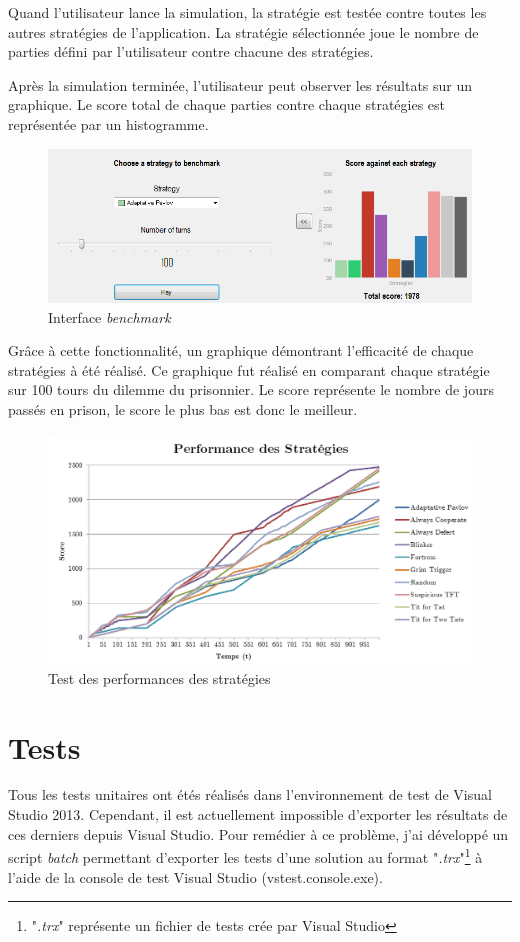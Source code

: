 \documentclass[a4paper]{article}
\begin{document}
Quand l'utilisateur lance la simulation, la stratégie est testée contre toutes les autres stratégies de l'application. La stratégie sélectionnée joue le nombre de parties défini par l'utilisateur contre chacune des stratégies.

Après la simulation terminée, l'utilisateur peut observer les résultats sur un graphique. Le score total de chaque parties contre chaque stratégies est représentée par un histogramme.

\begin{figure}[htp]
    \centering
    \includegraphics[width=\linewidth - 3cm]{benchmark_gui.png}
    \caption{Interface \textit{benchmark}}
\end{figure}

Grâce à cette fonctionnalité, un graphique démontrant l'efficacité de chaque stratégies à été réalisé. Ce graphique fut réalisé en comparant chaque stratégie sur 100 tours du dilemme du prisonnier. Le score représente le nombre de jours passés en prison, le score le plus bas est donc le meilleur.

\begin{figure}[htp]
    \centering
    \includegraphics[width=\linewidth - 3cm]{benchmark.png}
    \caption{Test des performances des stratégies}
\end{figure}

\pagebreak
\section{Tests}
Tous les tests unitaires ont étés réalisés dans l'environnement de test de Visual Studio 2013. Cependant, il est actuellement impossible d'exporter les résultats de ces derniers depuis Visual Studio. Pour remédier à ce problème, j'ai développé un script \textit{batch} permettant d'exporter les tests d'une solution au format "\textit{.trx}"\footnote{"\textit{.trx}" représente un fichier de tests crée par Visual Studio} à l'aide de la console de test Visual Studio (vstest.console.exe).
\end{document}
